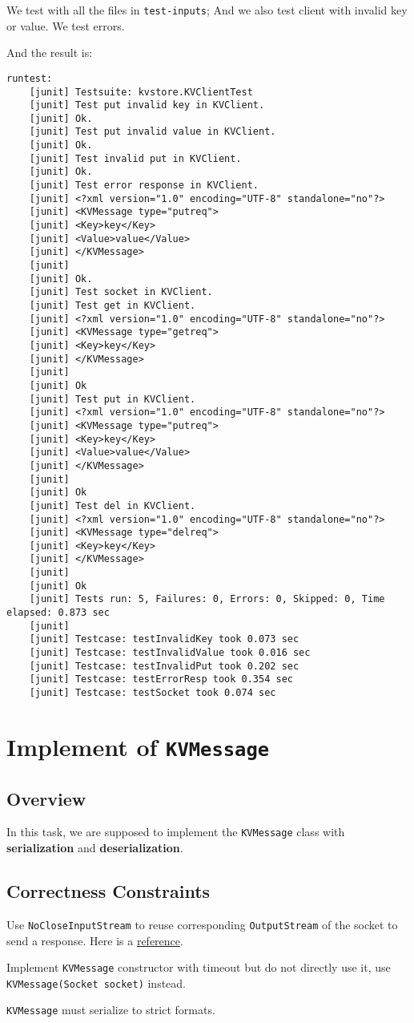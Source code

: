 \documentclass{article}
\begin{document}
We test with all the files in \texttt{test-inputs}; And we also test client with invalid key or value. We test errors.

And the result is:
\begin{lstlisting}
runtest:
    [junit] Testsuite: kvstore.KVClientTest
    [junit] Test put invalid key in KVClient.
    [junit] Ok.
    [junit] Test put invalid value in KVClient.
    [junit] Ok.
    [junit] Test invalid put in KVClient.
    [junit] Ok.
    [junit] Test error response in KVClient.
    [junit] <?xml version="1.0" encoding="UTF-8" standalone="no"?>
    [junit] <KVMessage type="putreq">
    [junit] <Key>key</Key>
    [junit] <Value>value</Value>
    [junit] </KVMessage>
    [junit] 
    [junit] Ok.
    [junit] Test socket in KVClient.
    [junit] Test get in KVClient.
    [junit] <?xml version="1.0" encoding="UTF-8" standalone="no"?>
    [junit] <KVMessage type="getreq">
    [junit] <Key>key</Key>
    [junit] </KVMessage>
    [junit] 
    [junit] Ok
    [junit] Test put in KVClient.
    [junit] <?xml version="1.0" encoding="UTF-8" standalone="no"?>
    [junit] <KVMessage type="putreq">
    [junit] <Key>key</Key>
    [junit] <Value>value</Value>
    [junit] </KVMessage>
    [junit] 
    [junit] Ok
    [junit] Test del in KVClient.
    [junit] <?xml version="1.0" encoding="UTF-8" standalone="no"?>
    [junit] <KVMessage type="delreq">
    [junit] <Key>key</Key>
    [junit] </KVMessage>
    [junit] 
    [junit] Ok
    [junit] Tests run: 5, Failures: 0, Errors: 0, Skipped: 0, Time elapsed: 0.873 sec
    [junit] 
    [junit] Testcase: testInvalidKey took 0.073 sec
    [junit] Testcase: testInvalidValue took 0.016 sec
    [junit] Testcase: testInvalidPut took 0.202 sec
    [junit] Testcase: testErrorResp took 0.354 sec
    [junit] Testcase: testSocket took 0.074 sec
\end{lstlisting}

\section{Implement of \texttt{KVMessage}}
\subsection{Overview}
In this task, we are supposed to implement the \texttt{KVMessage} class with \textbf{serialization} and \textbf{deserialization}.

\subsection{Correctness Constraints}
\begin{compactitem}
	\item Use \texttt{NoCloseInputStream} to reuse corresponding \texttt{OutputStream} of the socket to send a response.
		Here is a \href{https://weblogs.java.net/blog/kohsuke/archive/2005/07/socket_xml_pitf.html}{reference}.
	\item Implement \texttt{KVMessage} constructor with timeout but do not directly use it, use \texttt{KVMessage(Socket socket)} instead.
	\item \texttt{KVMessage} must serialize to strict formats.
\end{compactitem}
\end{document}
